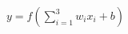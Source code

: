 \documentclass[preview]{standalone}
\begin{document}
\begin{align*}
y = f\left(\sum_{i=1}^3 w_i x_i + b\right)
\end{align*}
\end{document}
